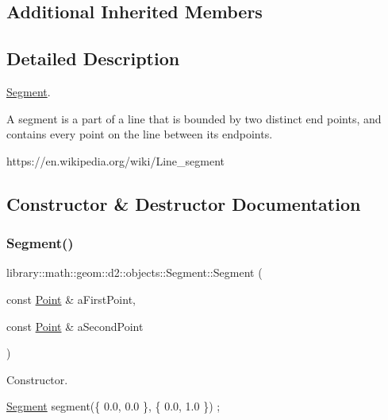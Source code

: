 \subsection*{Additional Inherited Members}


\subsection{Detailed Description}
\hyperlink{classlibrary_1_1math_1_1geom_1_1d2_1_1objects_1_1_segment}{Segment}. 

A segment is a part of a line that is bounded by two distinct end points, and contains every point on the line between its endpoints.

https\+://en.wikipedia.\+org/wiki/\+Line\+\_\+segment 

\subsection{Constructor \& Destructor Documentation}
\mbox{\label{classlibrary_1_1math_1_1geom_1_1d2_1_1objects_1_1_segment_a44ba44fd5f02a02fe34c40223b38fa8f}} 
\subsubsection{\texorpdfstring{Segment()}{Segment()}}
{\footnotesize\ttfamily library\+::math\+::geom\+::d2\+::objects\+::\+Segment\+::\+Segment (\begin{DoxyParamCaption}\item[{const \hyperlink{classlibrary_1_1math_1_1geom_1_1d2_1_1objects_1_1_point}{Point} \&}]{a\+First\+Point,  }\item[{const \hyperlink{classlibrary_1_1math_1_1geom_1_1d2_1_1objects_1_1_point}{Point} \&}]{a\+Second\+Point }\end{DoxyParamCaption})}



Constructor. 


\begin{DoxyCode}
\hyperlink{classlibrary_1_1math_1_1geom_1_1d2_1_1objects_1_1_segment_a44ba44fd5f02a02fe34c40223b38fa8f}{Segment} segment(\{ 0.0, 0.0 \}, \{ 0.0, 1.0 \}) ;
\end{DoxyCode}



